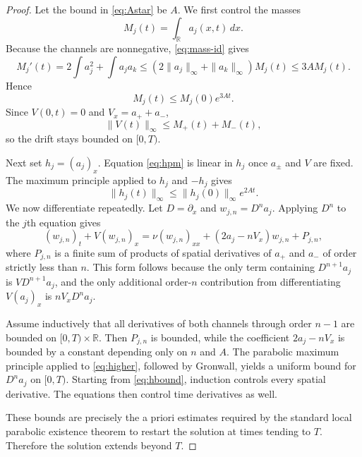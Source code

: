 \documentclass[11pt]{article}
\theoremstyle{definition}
\newcommand{\R}{\mathbb R}
\begin{document}
\begin{proof}
Let the bound in \eqref{eq:Astar} be $A$.  We first control the masses
\[
 M_j(t)=\int_\R a_j(x,t)\,dx.
\]
Because the channels are nonnegative, \eqref{eq:mass-id} gives
\[
 M_j'(t)
 =2\int a_j^2+\int a_ja_k
 \le (2\|a_j\|_\infty+\|a_k\|_\infty)M_j(t)
 \le 3A M_j(t).
\]
Hence
\begin{equation}\label{eq:massbound}
 M_j(t)\le M_j(0)e^{3At}.
\end{equation}
Since $V(0,t)=0$ and $V_x=a_++a_-$,
\begin{equation}\label{eq:Vbound}
 \|V(t)\|_\infty
 \le M_+(t)+M_-(t),
\end{equation}
so the drift stays bounded on $[0,T)$.

Next set $h_j=(a_j)_x$.  Equation \eqref{eq:hpm} is linear in $h_j$ once $a_\pm$ and $V$ are fixed.  The maximum principle applied to $h_j$ and $-h_j$ gives
\begin{equation}\label{eq:hbound}
 \|h_j(t)\|_\infty
 \le \|h_j(0)\|_\infty e^{2At}.
\end{equation}
We now differentiate repeatedly.  Let $D=\partial_x$ and $w_{j,n}=D^na_j$.  Applying $D^n$ to the $j$th equation gives
\begin{equation}\label{eq:higher}
 (w_{j,n})_t+V(w_{j,n})_x
 =\nu(w_{j,n})_{xx}
 +(2a_j-nV_x)w_{j,n}+P_{j,n},
\end{equation}
where $P_{j,n}$ is a finite sum of products of spatial derivatives of $a_+$ and $a_-$ of order strictly less than $n$.  This form follows because the only term containing $D^{n+1}a_j$ is $V D^{n+1}a_j$, and the only additional order-$n$ contribution from differentiating $V(a_j)_x$ is $nV_xD^na_j$.

Assume inductively that all derivatives of both channels through order $n-1$ are bounded on $[0,T)\times\R$.  Then $P_{j,n}$ is bounded, while the coefficient $2a_j-nV_x$ is bounded by a constant depending only on $n$ and $A$.  The parabolic maximum principle applied to \eqref{eq:higher}, followed by Gronwall, yields a uniform bound for $D^na_j$ on $[0,T)$.  Starting from \eqref{eq:hbound}, induction controls every spatial derivative.  The equations then control time derivatives as well.

These bounds are precisely the a priori estimates required by the standard local parabolic existence theorem to restart the solution at times tending to $T$.  Therefore the solution extends beyond $T$.
\end{proof}
\end{document}
